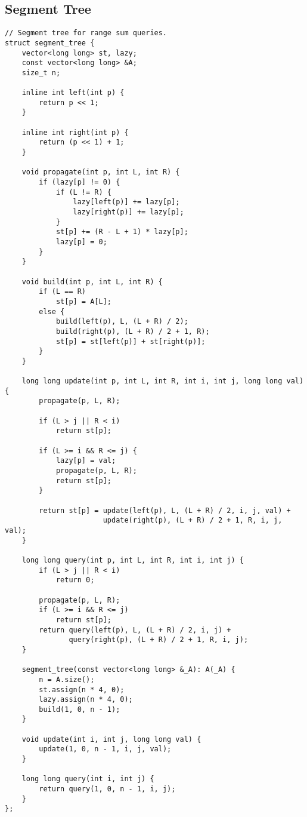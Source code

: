 \documentclass[letterpaper]{article}
\begin{document}
\subsection{Segment Tree}
\begin{lstlisting}
// Segment tree for range sum queries.
struct segment_tree {
    vector<long long> st, lazy;
    const vector<long long> &A;
    size_t n;

    inline int left(int p) {
        return p << 1;
    }

    inline int right(int p) {
        return (p << 1) + 1;
    }

    void propagate(int p, int L, int R) {
        if (lazy[p] != 0) {
            if (L != R) {
                lazy[left(p)] += lazy[p];
                lazy[right(p)] += lazy[p];
            }
            st[p] += (R - L + 1) * lazy[p];
            lazy[p] = 0;
        }
    }

    void build(int p, int L, int R) {
        if (L == R)
            st[p] = A[L];
        else {
            build(left(p), L, (L + R) / 2);
            build(right(p), (L + R) / 2 + 1, R);
            st[p] = st[left(p)] + st[right(p)];
        }
    }

    long long update(int p, int L, int R, int i, int j, long long val) {
        propagate(p, L, R);

        if (L > j || R < i)
            return st[p];

        if (L >= i && R <= j) {
            lazy[p] = val;
            propagate(p, L, R);
            return st[p];
        }

        return st[p] = update(left(p), L, (L + R) / 2, i, j, val) + 
                       update(right(p), (L + R) / 2 + 1, R, i, j, val);
    }

    long long query(int p, int L, int R, int i, int j) {
        if (L > j || R < i)
            return 0;

        propagate(p, L, R);
        if (L >= i && R <= j)
            return st[p];
        return query(left(p), L, (L + R) / 2, i, j) +
               query(right(p), (L + R) / 2 + 1, R, i, j);
    }

    segment_tree(const vector<long long> &_A): A(_A) {
        n = A.size();
        st.assign(n * 4, 0);
        lazy.assign(n * 4, 0);
        build(1, 0, n - 1);
    }

    void update(int i, int j, long long val) {
        update(1, 0, n - 1, i, j, val);
    }

    long long query(int i, int j) {
        return query(1, 0, n - 1, i, j);
    }
};
\end{lstlisting}
\end{document}
